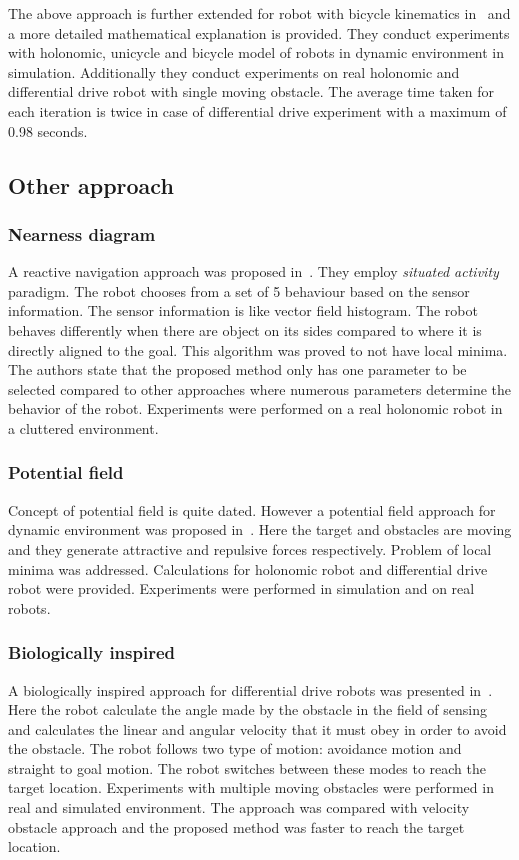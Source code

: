 The above approach is further extended for robot with bicycle kinematics in~\cite{mercy2017spline}
and a more detailed mathematical explanation is provided. They conduct experiments with 
holonomic, unicycle and bicycle model of robots in dynamic environment in simulation. 
Additionally they conduct experiments on real holonomic and differential drive robot with 
single moving obstacle. The average time taken for each iteration is twice in case of differential
drive experiment with a maximum of 0.98 seconds.


\subsection{Other approach}%
\label{sub:other_approach}

\subsubsection{Nearness diagram}%
\label{ssub:nearness_diagram}
A reactive navigation approach was proposed in~\cite{minguez2004nearness}.
They employ \textit{situated activity} paradigm. The robot chooses from a set of 5 behaviour
based on the sensor information. The sensor information is like vector field histogram.
The robot behaves differently when there are object on its sides compared to where it is 
directly aligned to the goal. This algorithm was proved to not have local minima. The 
authors state that the proposed method only has one parameter to be selected compared to 
other approaches where numerous parameters determine the behavior of the robot. Experiments 
were performed on a real holonomic robot in a cluttered environment.


\subsubsection{Potential field}%
\label{subsub:potential_field}
Concept of potential field is quite dated. However a potential field approach for dynamic 
environment was proposed in~\cite{ge2002dynamic}. 
Here the target and obstacles are moving and they generate attractive and repulsive forces 
respectively. Problem of local minima was addressed. Calculations for holonomic robot and 
differential drive robot were provided. Experiments were performed in simulation and on real robots. 

\subsubsection{Biologically inspired}%
\label{subsub:biologically_inspired}
A biologically inspired approach for differential drive robots was presented 
in~\cite{savkin2013simple}. Here the robot calculate the angle made by the obstacle in the 
field of sensing and calculates the linear and angular velocity that it must obey in order 
to avoid the obstacle. The robot follows two type of motion: avoidance motion and straight 
to goal motion. The robot switches between these modes to reach the target location. 
Experiments with multiple moving obstacles were performed in real and simulated environment. 
The approach was compared with velocity obstacle approach and the proposed method was faster 
to reach the target location.


